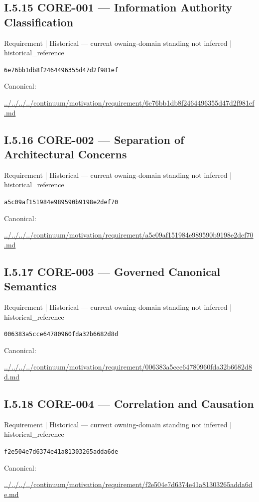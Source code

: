 \documentclass[10pt,a4paper]{article}
\begin{document}
\subsection*{I.5.15 CORE-001 — Information Authority Classification}
{\small Requirement | Historical — current owning-domain standing not inferred | historical\_reference}\par
\texttt{6e76bb1db8f2464496355d47d2f981ef}\par
Canonical: \par
{\footnotesize\url{../../../../continuum/motivation/requirement/6e76bb1db8f2464496355d47d2f981ef.md}}\par
\subsection*{I.5.16 CORE-002 — Separation of Architectural Concerns}
{\small Requirement | Historical — current owning-domain standing not inferred | historical\_reference}\par
\texttt{a5c09af151984e989590b9198e2def70}\par
Canonical: \par
{\footnotesize\url{../../../../continuum/motivation/requirement/a5c09af151984e989590b9198e2def70.md}}\par
\subsection*{I.5.17 CORE-003 — Governed Canonical Semantics}
{\small Requirement | Historical — current owning-domain standing not inferred | historical\_reference}\par
\texttt{006383a5cce64780960fda32b6682d8d}\par
Canonical: \par
{\footnotesize\url{../../../../continuum/motivation/requirement/006383a5cce64780960fda32b6682d8d.md}}\par
\subsection*{I.5.18 CORE-004 — Correlation and Causation}
{\small Requirement | Historical — current owning-domain standing not inferred | historical\_reference}\par
\texttt{f2e504e7d6374e41a81303265adda6de}\par
Canonical: \par
{\footnotesize\url{../../../../continuum/motivation/requirement/f2e504e7d6374e41a81303265adda6de.md}}\par
\end{document}

